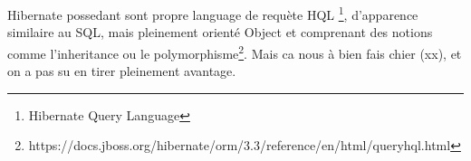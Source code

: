 Hibernate possedant sont propre language de requète HQL \footnote{Hibernate Query Language}, d'apparence similaire au SQL, mais pleinement orienté Object et comprenant des notions comme l'inheritance ou le polymorphisme\footnote{https://docs.jboss.org/hibernate/orm/3.3/reference/en/html/queryhql.html}.  Mais ca nous à bien fais chier (xx), et on a pas su en tirer pleinement avantage.

